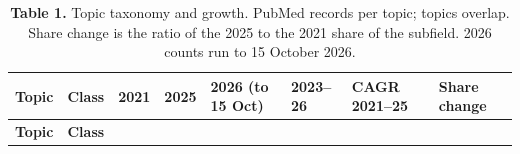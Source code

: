 \documentclass{article}
\begin{document}
\begin{longtable}[l]{@{}
  >{\raggedright\arraybackslash}p{}
  >{\raggedright\arraybackslash}p{}
  >{\raggedright\arraybackslash}p{}
  >{\raggedright\arraybackslash}p{}
  >{\raggedright\arraybackslash}p{}
  >{\raggedright\arraybackslash}p{}
  >{\raggedright\arraybackslash}p{}
  >{\raggedright\arraybackslash}p{}@{}}
\caption{\textbf{Table 1.} Topic taxonomy and growth. PubMed records per topic;
topics overlap. Share change is the ratio of the 2025 to the 2021 share
of the subfield. 2026 counts run to 15 October 2026.}\tabularnewline
\toprule
\begin{minipage}[b]{\linewidth}\raggedright
\textbf{Topic}
\end{minipage} & \begin{minipage}[b]{\linewidth}\raggedright
\textbf{Class}
\end{minipage} & \begin{minipage}[b]{\linewidth}\raggedright
\textbf{2021}
\end{minipage} & \begin{minipage}[b]{\linewidth}\raggedright
\textbf{2025}
\end{minipage} & \begin{minipage}[b]{\linewidth}\raggedright
\textbf{2026 (to 15 Oct)}
\end{minipage} & \begin{minipage}[b]{\linewidth}\raggedright
\textbf{2023--26}
\end{minipage} & \begin{minipage}[b]{\linewidth}\raggedright
\textbf{CAGR 2021--25}
\end{minipage} & \begin{minipage}[b]{\linewidth}\raggedright
\textbf{Share change}
\end{minipage} \\
\midrule
\endfirsthead
\toprule
\begin{minipage}[b]{\linewidth}\raggedright
\textbf{Topic}
\end{minipage} & \begin{minipage}[b]{\linewidth}\raggedright
\textbf{Class}
\end{minipage} & \begin{minipage}[b]{\linewidth}\raggedright

\end{minipage}
\end{longtable}
\end{document}
